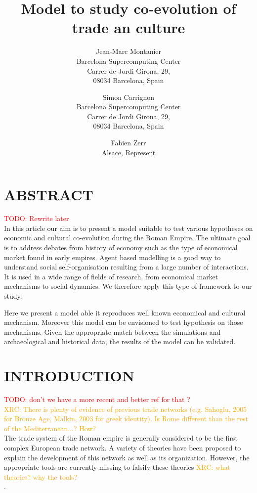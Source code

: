 \documentclass{wscpaperproc}
\newcommand{\memo}[2]{\textcolor{#1}{#2}}
\newcommand{\todo}[1]{\memo{red}{TODO: #1\\}}
\newcommand{\xrc}[1]{\memo{orange}{XRC: #1\\}}
\begin{document}

\title{Model to study co-evolution of trade an culture}

\author{Jean-Marc Montanier\\ [12pt]
Barcelona Supercomputing Center\\
Carrer de Jordi Girona, 29, \\
08034 Barcelona, Spain\\
\and
Simon Carrignon\\ [12pt]
Barcelona Supercomputing Center\\
Carrer de Jordi Girona, 29, \\
08034 Barcelona, Spain\\
\and
Fabien Zerr\\ [12pt]
Alsace, Represent
}






\maketitle


\section*{ABSTRACT}

\todo{Rewrite later}
In this article our aim is to present a model suitable to test various hypotheses on economic and cultural co-evolution during the Roman Empire. The ultimate goal is to address debates from history of economy such as the type of economical market found in early empires. Agent based modelling is a good way to understand social self-organisation resulting from a large number of interactions. It is used in a wide range of fields of research, from economical market mechanisms to social dynamics. We therefore apply this type of framework to our study.

Here we present a model able it reproduces well known economical and cultural mechanism. Moreover this model can be envisioned to test hypothesis on those mechanisms. Given the appropriate match between the simulations and archaeological and historical data, the results of the model can be validated.


\section{INTRODUCTION}

\todo{don't we have a more recent and better ref for that ?}
\xrc{There is plenty of evidence of previous trade networks (e.g. Sahoglu, 2005 for Bronze Age, Malkin, 2003 for greek identity). Is Rome different than the rest of the Mediterranean...? How?}
The trade system of the Roman empire is generally considered to be the first complex European trade network. A variety of theories have been proposed to explain the development of this network as well as its organization. However, the appropriate tools are currently missing to falsify these theories \cite{garnsey_trade_1983} \xrc{what theories? why the tools?}. 
\end{document}

